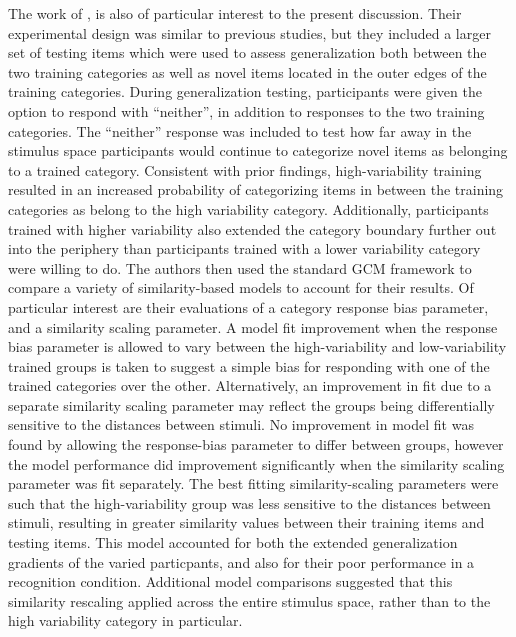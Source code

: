\documentclass[
  12pt,
  letterpaper,
]{article}
\begin{document}
The work of \textcite{hahnEffectsCategoryDiversity2005}, is also of
particular interest to the present discussion. Their experimental design
was similar to previous studies, but they included a larger set of
testing items which were used to assess generalization both between the
two training categories as well as novel items located in the outer
edges of the training categories. During generalization testing,
participants were given the option to respond with ``neither'', in
addition to responses to the two training categories. The ``neither''
response was included to test how far away in the stimulus space
participants would continue to categorize novel items as belonging to a
trained category. Consistent with prior findings, high-variability
training resulted in an increased probability of categorizing items in
between the training categories as belong to the high variability
category. Additionally, participants trained with higher variability
also extended the category boundary further out into the periphery than
participants trained with a lower variability category were willing to
do. The authors then used the standard GCM framework to compare a
variety of similarity-based models to account for their results. Of
particular interest are their evaluations of a category response bias
parameter, and a similarity scaling parameter. A model fit improvement
when the response bias parameter is allowed to vary between the
high-variability and low-variability trained groups is taken to suggest
a simple bias for responding with one of the trained categories over the
other. Alternatively, an improvement in fit due to a separate similarity
scaling parameter may reflect the groups being differentially sensitive
to the distances between stimuli. No improvement in model fit was found
by allowing the response-bias parameter to differ between groups,
however the model performance did improvement significantly when the
similarity scaling parameter was fit separately. The best fitting
similarity-scaling parameters were such that the high-variability group
was less sensitive to the distances between stimuli, resulting in
greater similarity values between their training items and testing
items. This model accounted for both the extended generalization
gradients of the varied particpants, and also for their poor performance
in a recognition condition. Additional model comparisons suggested that
this similarity rescaling applied across the entire stimulus space,
rather than to the high variability category in particular.
\end{document}
